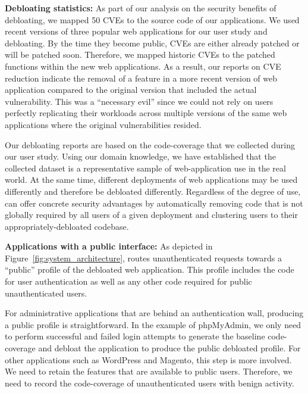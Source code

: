 
\noindent\textbf{Debloating statistics: }
As part of our analysis on the security benefits of debloating, we mapped 50 CVEs to the source code of our applications. 
We used recent versions of three popular web applications for our user study and debloating.
By the time they become public, CVEs are either already patched or will be patched soon. 
Therefore, we mapped historic CVEs to the patched functions within the new web applications. 
As a result, our reports on CVE reduction indicate the removal of a feature in a more recent version of web application compared to the original version that included the actual vulnerability. This was a ``necessary evil'' since we could not rely on users perfectly replicating their workloads across multiple versions of the same web applications where the original vulnerabilities resided.

Our debloating reports are based on the code-coverage that we collected during our user study. Using our domain knowledge, we have established that the collected dataset is a representative sample of web-application use in the real world. At the same time, different deployments of web applications may be used differently and therefore be debloated differently. Regardless of the degree of use, \sys{} can offer concrete security advantages by automatically removing code that is not globally required by all users of a given deployment and clustering users to their appropriately-debloated codebase.


\noindent\textbf{Applications with a public interface: }
As depicted in Figure~\ref{fig:system_architecture}, \sys{} routes unauthenticated requests towards a ``public'' profile of the debloated web application. 
This profile includes the code for user authentication as well as any other code required for public unauthenticated users. 

For administrative applications that are behind an authentication wall, producing a public profile is straightforward. 
In the example of phpMyAdmin, we only need to perform successful and failed login attempts to generate the baseline code-coverage and debloat the application to produce the public debloated profile. 
For other applications such as WordPress and Magento, this step is more involved. 
We need to retain the features that are available to public users. 
Therefore, we need to record the code-coverage of unauthenticated users with benign activity. 

